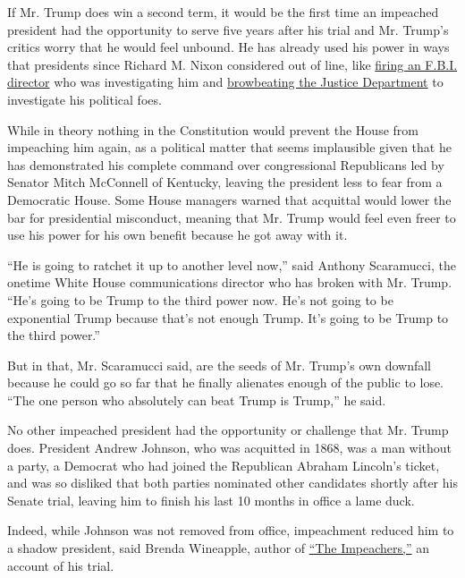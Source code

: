 If Mr. Trump does win a second term, it would be the first time an
impeached president had the opportunity to serve five years after his
trial and Mr. Trump's critics worry that he would feel unbound. He has
already used his power in ways that presidents since Richard M. Nixon
considered out of line, like
\href{https://www.nytimes.com/2017/05/09/us/politics/james-comey-fired-fbi.html}{firing
an F.B.I. director} who was investigating him and
\href{https://www.nytimes.com/2017/11/03/us/politics/trump-says-justice-dept-and-fbi-must-do-what-is-right-and-investigate-democrats.html}{browbeating
the Justice Department} to investigate his political foes.

While in theory nothing in the Constitution would prevent the House from
impeaching him again, as a political matter that seems implausible given
that he has demonstrated his complete command over congressional
Republicans led by Senator Mitch McConnell of Kentucky, leaving the
president less to fear from a Democratic House. Some House managers
warned that acquittal would lower the bar for presidential misconduct,
meaning that Mr. Trump would feel even freer to use his power for his
own benefit because he got away with it.

``He is going to ratchet it up to another level now,'' said Anthony
Scaramucci, the onetime White House communications director who has
broken with Mr. Trump. ``He's going to be Trump to the third power now.
He's not going to be exponential Trump because that's not enough Trump.
It's going to be Trump to the third power.''

But in that, Mr. Scaramucci said, are the seeds of Mr. Trump's own
downfall because he could go so far that he finally alienates enough of
the public to lose. ``The one person who absolutely can beat Trump is
Trump,'' he said.

No other impeached president had the opportunity or challenge that Mr.
Trump does. President Andrew Johnson, who was acquitted in 1868, was a
man without a party, a Democrat who had joined the Republican Abraham
Lincoln's ticket, and was so disliked that both parties nominated other
candidates shortly after his Senate trial, leaving him to finish his
last 10 months in office a lame duck.

Indeed, while Johnson was not removed from office, impeachment reduced
him to a shadow president, said Brenda Wineapple, author of
\href{https://www.nytimes.com/2019/05/15/books/review-impeachers-andrew-johnson-brenda-wineapple.html}{``The
Impeachers,''} an account of his trial.

